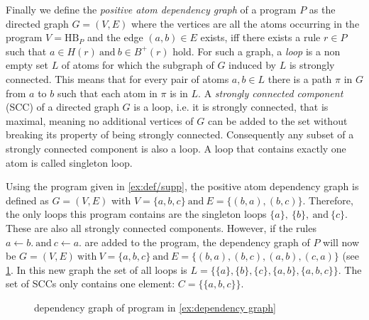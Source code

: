 Finally we define the \emph{positive atom dependency graph} of a program $P$ as the directed graph \(G = (V, E)\) where the vertices are all the atoms occurring in the program \(V = \text{HB}_P\) and the edge \((a,b) \in E\) exists, iff there exists a rule \(r \in P\) such that \(a \in H(r) \ \text{and}\ b \in B^+(r)\) hold.
For such a graph, a \emph{loop} is a non empty set $L$ of atoms for which the subgraph of $G$ induced by $L$ is strongly connected. This means that for every pair of atoms \(a,b \in L\) there is a path $\pi$ in $G$ from $a$ to $b$ such that each atom in $\pi$ is in $L$.
A \emph{strongly connected component} (SCC) of a directed graph $G$ is a loop, i.e. it is strongly connected, that is maximal, meaning no additional vertices of $G$ can be added to the set without breaking its property of being strongly connected. Consequently any subset of a strongly connected component is also a loop.
A loop that contains exactly one atom is called singleton loop.
\begin{example}
\label{ex:dependency graph}
    Using the program given in \cref{ex:def/supp}, the positive atom dependency graph is defined as \(G = (V, E)\) with \(V = \{a, b, c\}\ \text{and}\ E = \{(b, a), (b, c)\}\). Therefore, the only loops this program contains are the singleton loops \(\{a\},\ \{b\},\ \text{and}\ \{c\}\). These are also all strongly connected components. 
    However, if the rules \(a \leftarrow b.\ \text{and}\ c \leftarrow a.\) are added to the program, the dependency graph of $P$ will now be \(G = (V, E)\ \text{with}\ V = \{a,b,c\}\ \text{and}\ E = \{(b,a), (b,c), (a,b), (c,a)\}\) (see \cref{fig:dependency graph}. In this new graph the set of all loops is \(L = \{\{a\},\{b\},\{c\},\{a,b\},\{a,b,c\}\}\). The set of SCCs only contains one element: \(C = \{\{a,b,c\}\}\).
\end{example}

\begin{figure}
    \centering
    \caption{dependency graph of program in \cref{ex:dependency graph}}
    \label{fig:dependency graph}
\end{figure}


